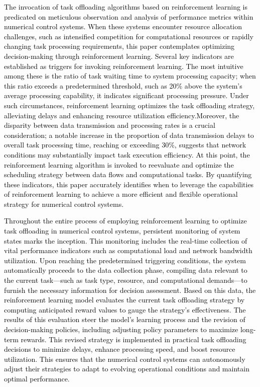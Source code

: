 \documentclass[preprint,12pt]{elsarticle}
\begin{document}
\textcolor{black}{The invocation of task offloading algorithms based on reinforcement learning is predicated on meticulous observation and analysis of performance metrics within numerical control systems. When these systems encounter resource allocation challenges, such as intensified competition for computational resources or rapidly changing task processing requirements, this paper contemplates optimizing decision-making through reinforcement learning. Several key indicators are established as triggers for invoking reinforcement learning. The most intuitive among these is the ratio of task waiting time to system processing capacity; when this ratio exceeds a predetermined threshold, such as 20\% above the system's average processing capability, it indicates significant processing pressure. Under such circumstances, reinforcement learning optimizes the task offloading strategy, alleviating delays and enhancing resource utilization efficiency.Moreover, the disparity between data transmission and processing rates is a crucial consideration; a notable increase in the proportion of data transmission delays to overall task processing time, reaching or exceeding 30\%, suggests that network conditions may substantially impact task execution efficiency. At this point, the reinforcement learning algorithm is invoked to reevaluate and optimize the scheduling strategy between data flows and computational tasks. By quantifying these indicators, this paper accurately identifies when to leverage the capabilities of reinforcement learning to achieve a more efficient and flexible operational strategy for numerical control systems.}

\textcolor{black}{Throughout the entire process of employing reinforcement learning to optimize task offloading in numerical control systems, persistent monitoring of system states marks the inception. This monitoring includes the real-time collection of vital performance indicators such as computational load and network bandwidth utilization. Upon reaching the predetermined triggering conditions, the system automatically proceeds to the data collection phase, compiling data relevant to the current task—such as task type, resource, and computational demands—to furnish the necessary information for decision assessment. Based on this data, the reinforcement learning model evaluates the current task offloading strategy by computing anticipated reward values to gauge the strategy's effectiveness. The results of this evaluation steer the model's learning process and the revision of decision-making policies, including adjusting policy parameters to maximize long-term rewards. This revised strategy is implemented in practical task offloading decisions to minimize delays, enhance processing speed, and boost resource utilization. This ensures that the numerical control systems can autonomously adjust their strategies to adapt to evolving operational conditions and maintain optimal performance.}
\end{document}
